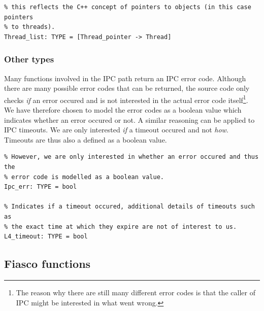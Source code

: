 \lstset{language=PVS}
\begin{lstlisting}[caption={PVS: definition of thread list.}]
% The thread list is a function which translates thread pointers to threads;
% this reflects the C++ concept of pointers to objects (in this case pointers
% to threads).
Thread_list: TYPE = [Thread_pointer -> Thread]
\end{lstlisting}

\subsubsection{Other types}
Many functions involved in the IPC path return an IPC error code. Although there are many possible error codes that can be returned, the source code only checks \textit{if} an error occured and is not interested in the actual error code itself\footnote{The reason why there are still many different error codes is that the caller of IPC might be interested in what went wrong.}. We have therefore chosen to model the error codes as a boolean value which indicates whether an error occured or not. A similar reasoning can be applied to IPC timeouts. We are only interested \textit{if} a timeout occured and not \textit{how}. Timeouts are thus also a defined as a boolean value.

\lstset{language=PVS}
\begin{lstlisting}[caption={PVS: IPC error codes- and timeout definitions.}]
% Most functions in Fiasco return an error code, of which there are many.
% However, we are only interested in whether an error occured and thus the
% error code is modelled as a boolean value.
Ipc_err: TYPE = bool

% Indicates if a timeout occured, additional details of timeouts such as 
% the exact time at which they expire are not of interest to us.
L4_timeout: TYPE = bool
\end{lstlisting}

\subsection{Fiasco functions}


